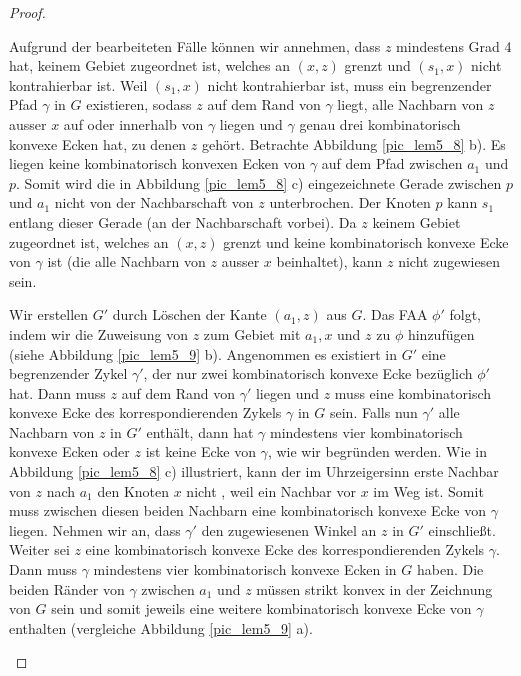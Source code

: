 \begin{proof}
\begin{description}[leftmargin =0pt, font = \rmfamily ]
\item[Fall 1d:] Aufgrund der bearbeiteten Fälle können wir annehmen, dass $z$ mindestens Grad 4 hat, keinem Gebiet zugeordnet ist, welches an $(x,z)$ grenzt und $(s_1,x)$ nicht kontrahierbar ist. Weil $(s_1,x)$ nicht kontrahierbar ist, muss ein begrenzender Pfad $\gamma$ in $G$ existieren, sodass $z$ auf dem Rand von $\gamma$ liegt, alle Nachbarn von $z$ ausser $x$ auf oder innerhalb von $\gamma$ liegen und $\gamma$ genau drei kombinatorisch konvexe Ecken hat, zu denen $z$ gehört. Betrachte Abbildung \ref{pic_lem5_8} b). Es liegen keine kombinatorisch konvexen Ecken von $\gamma$ auf dem Pfad zwischen $a_1$ und $p$. Somit wird die in Abbildung \ref{pic_lem5_8} c) eingezeichnete Gerade zwischen $p$ und $a_1$ nicht von der Nachbarschaft von $z$ unterbrochen. Der Knoten $p$ kann $s_1$ entlang dieser Gerade \grqq{ } (an der Nachbarschaft vorbei). Da $z$ keinem Gebiet zugeordnet ist, welches an $(x,z)$ grenzt und keine kombinatorisch konvexe Ecke von $\gamma$ ist (die alle Nachbarn von $z$ ausser $x$ beinhaltet), kann $z$ nicht zugewiesen sein. 

Wir erstellen $G'$ durch Löschen der Kante $(a_1,z)$ aus $G$. Das FAA $\phi'$ folgt, indem wir die Zuweisung von $z$ zum Gebiet mit $a_1,x$ und $z$ zu $\phi$ hinzufügen (siehe Abbildung \ref{pic_lem5_9} b). Angenommen es existiert in $G'$ eine begrenzender Zykel $\gamma'$, der nur zwei kombinatorisch konvexe Ecke bezüglich $\phi'$ hat. Dann muss $z$ auf dem Rand von $\gamma'$ liegen und $z$ muss eine kombinatorisch konvexe Ecke des korrespondierenden Zykels $\gamma$ in $G$ sein. Falls nun $\gamma'$ alle Nachbarn von $z$ in $G'$ enthält, dann hat $\gamma$ mindestens vier kombinatorisch konvexe Ecken oder $z$ ist keine Ecke von $\gamma$, wie wir begründen werden. Wie in Abbildung \ref{pic_lem5_8} c) illustriert, kann der im Uhrzeigersinn erste Nachbar von $z$ nach $a_1$ den Knoten $x$ nicht \grqq, weil ein Nachbar vor $x$ im Weg ist. Somit muss zwischen diesen beiden Nachbarn eine kombinatorisch konvexe Ecke von $\gamma$ liegen. Nehmen wir an, dass $\gamma'$ den zugewiesenen Winkel an $z$ in $G'$ einschließt. Weiter sei $z$ eine kombinatorisch konvexe Ecke des korrespondierenden Zykels $\gamma$. Dann muss $\gamma$ mindestens vier kombinatorisch konvexe Ecken in $G$ haben. Die beiden Ränder von $\gamma$ zwischen $a_1$ und $z$ müssen strikt konvex in der Zeichnung von $G$ sein und somit jeweils eine weitere kombinatorisch konvexe Ecke von $\gamma$ enthalten (vergleiche Abbildung \ref{pic_lem5_9} a).


\end{description}
\end{proof}
